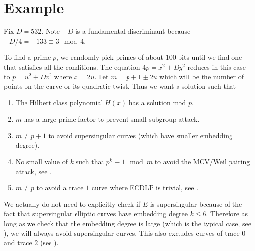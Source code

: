 \documentclass[11pt]{article}
\begin{document}
\section{Example}

Fix $D = 532$. Note $-D$ is a fundamental discriminant because $-D/4 = -133 \equiv 3\mod{4}$.

To find a prime $p$, we randomly pick primes of about $100$ bits until we find one that satisfies all the conditions. The equation $4p = x^2 + Dy^2$ reduces in this case to $p = u^2 + Dv^2$ where $x = 2u$. Let $m = p + 1 \pm 2u$ which will be the number of points on the curve or its quadratic twist. Thus we want a solution such that
\begin{enumerate}[$\bullet$]
	\item The Hilbert class polynomial $H(x)$ has a solution mod $p$.
	\item $m$ has a large prime factor to prevent small subgroup attack.
	\item $m \neq p+1$ to avoid supersingular curves (which have smaller embedding degree).
	\item No small value of $k$ such that $p^k\equiv 1\mod{m}$ to avoid the MOV/Weil pairing attack, see \cite[Pg.~169]{hankerson2004guide}.
	\item $m\neq p$ to avoid a trace $1$ curve where ECDLP is trivial, see \cite{nigel1997trace1}.
\end{enumerate}
\begin{rem}
	We actually do not need to explicitly check if $E$ is supersingular because of the fact that supersingular elliptic curves have embedding degree $k\leq 6$. Therefore as long as we check that the embedding degree is large (which is the typical case, see \cite[Rem.~XI.6.3, Pg.~388]{silverman2009arithmetic}), we will always avoid supersingular curves. This also excludes curves of trace $0$ and trace $2$ (see \cite[Ch.~V.7]{blake1999elliptic}).
\end{rem}
\end{document}
